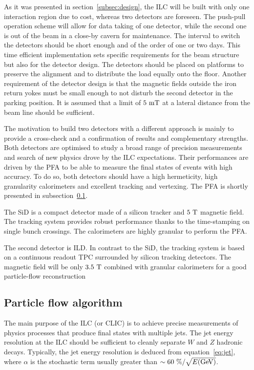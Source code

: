   As it was presented in section~\ref{subsec:design}, the \gls{ILC} will be built with only one interaction region due to cost, whereas two detectors are foreseen.
  The push-pull operation scheme will allow for data taking of one detector, while the second one is out of the beam in a close-by cavern for maintenance.
  The interval to switch the detectors should be short enough and of the order of one or two days.
  This time efficient implementation sets specific requirements for the beam structure but also for the detector design.
  The detectors should be placed on platforms to preserve the alignment and to distribute the load equally onto the floor.
  Another requirement of the detector design is that the magnetic fields outside the iron return yokes must be small enough to not disturb the second detector in the parking position.
  It is assumed that a limit of $5~\rm{mT}$ at a lateral distance from the beam line should be sufficient.

  The motivation to build two detectors with a different approach is mainly to provide a cross-check and a confirmation of results and complementary strengths.
  Both detectors are optimised to study a broad range of precision measurements and search of new physics drove by the \gls{ILC} expectations.
  Their performances are driven by the \gls{PFA} to be able to measure the final states of events with high accuracy.
  To do so, both detectors should have a high hermeticity, high granularity calorimeters and excellent tracking and vertexing.
  The \gls{PFA} is shortly presented in subsection~\ref{subsec:PFA}.

  The \gls{SiD} is a compact detector made of a silicon tracker and $5~\rm{T}$ magnetic field.
  The tracking system provides robust performance thanks to the time-stamping on single bunch crossings.
  The calorimeters are highly granular to perform the \gls{PFA}.

  The second detector is \gls{ILD}.
  In contrast to the \gls{SiD}, the tracking system is based on a continuous readout \gls{TPC} surrounded by silicon tracking detectors.
  The magnetic field will be only $3.5~\rm{T}$ combined with granular calorimeters for a good particle-flow reconstruction

    \subsection{Particle flow algorithm}
    \label{subsec:PFA}

    The main purpose of the \gls{ILC} (or \gls{CLIC}) is to achieve precise measurements of physics processes that produce final states with multiple jets.
    The jet energy resolution at the \gls{ILC} should be sufficient to cleanly separate $W$ and $Z$ hadronic decays.
    Typically, the jet energy resolution is deduced from equation~\ref{eq:jet}, where $\alpha$ is the stochastic term usually greater than $\sim 60~\% / \sqrt{E\rm{(GeV)}}$.


